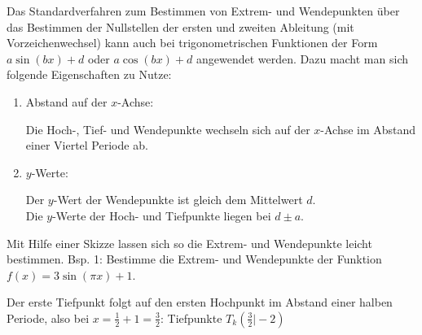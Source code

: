 Das Standardverfahren zum Bestimmen von Extrem- und Wendepunkten über das Bestimmen der Nullstellen der ersten und zweiten Ableitung (mit Vorzeichenwechsel) kann auch bei trigonometrischen Funktionen der Form \(a\sin(bx)+d\) oder \(a\cos(bx)+d\) angewendet werden. Dazu macht man sich folgende Eigenschaften zu Nutze:
\begin{enumerate}
	\item Abstand auf der \(x\)-Achse:

    \textcolor{loes}{Die Hoch-, Tief- und Wendepunkte wechseln sich auf der \(x\)-Achse im Abstand einer Viertel Periode ab.}
	\item \(y\)-Werte:

    \textcolor{loes}{Der \(y\)-Wert der Wendepunkte ist gleich dem Mittelwert \(d\).\\Die \(y\)-Werte der Hoch- und Tiefpunkte liegen bei \(d\pm a\).}
\end{enumerate}
Mit Hilfe einer Skizze lassen sich so die Extrem- und Wendepunkte leicht bestimmen. Bsp. 1: Bestimme die Extrem- und Wendepunkte der Funktion \(f(x)=3\sin(\pi x)+1\).

\bigskip

\begin{minipage}{\textwidth}
\end{minipage}
\textcolor{loes}{Der erste Tiefpunkt folgt auf den ersten Hochpunkt im Abstand einer halben Periode, also bei \(x=\frac{1}{2}+1=\frac{3}{2}\):
	Tiefpunkte \(T_k\left(\frac{3}{2}\vert -2\right)\)}

